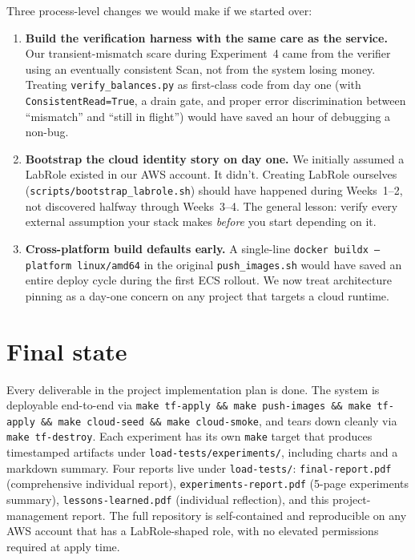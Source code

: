 \documentclass[11pt,a4paper]{article}
\begin{document}
\begin{warnbox}
Three process-level changes we would make if we started over:

\begin{enumerate}[leftmargin=*, itemsep=0.15em]
    \item \textbf{Build the verification harness with the same care as the service.} Our transient-mismatch scare during Experiment~4 came from the verifier using an eventually consistent Scan, not from the system losing money. Treating \texttt{verify\_balances.py} as first-class code from day one (with \texttt{ConsistentRead=True}, a drain gate, and proper error discrimination between ``mismatch'' and ``still in flight'') would have saved an hour of debugging a non-bug.

    \item \textbf{Bootstrap the cloud identity story on day one.} We initially assumed a LabRole existed in our AWS account. It didn't. Creating LabRole ourselves (\texttt{scripts/bootstrap\_labrole.sh}) should have happened during Weeks~1--2, not discovered halfway through Weeks~3--4. The general lesson: verify every external assumption your stack makes \textit{before} you start depending on it.

    \item \textbf{Cross-platform build defaults early.} A single-line \texttt{docker buildx --platform linux/amd64} in the original \texttt{push\_images.sh} would have saved an entire deploy cycle during the first ECS rollout. We now treat architecture pinning as a day-one concern on any project that targets a cloud runtime.
\end{enumerate}
\end{warnbox}

\section{Final state}

\begin{winbox}
Every deliverable in the project implementation plan is done. The system is deployable end-to-end via \texttt{make tf-apply \&\& make push-images \&\& make tf-apply \&\& make cloud-seed \&\& make cloud-smoke}, and tears down cleanly via \texttt{make tf-destroy}. Each experiment has its own \texttt{make} target that produces timestamped artifacts under \texttt{load-tests/experiments/}, including charts and a markdown summary. Four reports live under \texttt{load-tests/}: \texttt{final-report.pdf} (comprehensive individual report), \texttt{experiments-report.pdf} (5-page experiments summary), \texttt{lessons-learned.pdf} (individual reflection), and this project-management report. The full repository is self-contained and reproducible on any AWS account that has a LabRole-shaped role, with no elevated permissions required at apply time.
\end{winbox}
\end{document}

